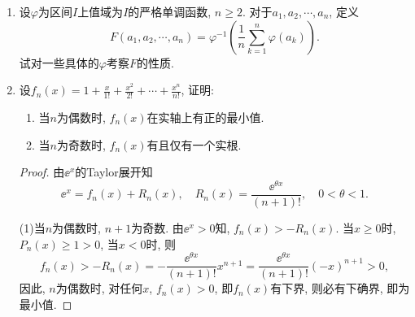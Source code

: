 \begin{3b}
\begin{enumerate}
\begin{proof}[解答]
例如，令 $g^{\prime \prime}(x)=\frac{1}{x^2+1}, g(0)=g^{\prime}(0)=0$，
则必有 $C>0$ 使得 $|g(x)| \leqslant C(|x|+1)$ $(\forall\, x \in \mathbb{R})$。具体地，有
\[g^{\prime}(x)=\arctan x \ \ \Rightarrow \ \ g(x)=x \arctan x-\frac{\ln (x^2+1)}{2},\ \ 0 \leqslant g(x) \leqslant \frac{\pi|x|}{2}.\]
因此，取 $f(x)=\frac{2}{\pi} g(x)$ 即得一个在 $\mathbb{R}$ 上任意次可导的严格凸函数满足 $0 \leqslant f(x) \leqslant |x|$。

若令 $g^{\prime \prime}(x)=\frac{1}{(x^2+1)^{\frac{3}{2}}}, g(0)=g^{\prime}(0)=0$，则
\[g^{\prime}(x)=\frac{x}{\sqrt{x^2+1}} \ \ \Rightarrow \ \ g(x)=\sqrt{x^2+1}-1.\]
若令 $g^{\prime \prime}(x)=\frac{2|x|}{(x^2+1)^2}, g(0)=g^{\prime}(0)=0$，则
\[g^{\prime}(x)=\frac{x^2 \operatorname{sgn}(x)}{x^2+1}\ \ \Rightarrow\ \ g(x)=|x|-\arctan |x|.\]
若令 $g^{\prime \prime}(x)=e^{-|x|}, g(0)=g^{\prime}(0)=0$，则
\[g^{\prime}(x)=\big(1-e^{-|x|}\big) \operatorname{sgn}(x)\ \ \Rightarrow\ \ g(x)=|x|+e^{-|x|}.\]
若令 $g^{\prime \prime}(x)=e^{-|x|}, g(0)=g^{\prime}(0)=0$，则
\[g^{\prime}(x)=\big(1-e^{-|x|}\big) \operatorname{sgn}(x)\ \ \Rightarrow\ \ g(x)=|x|+e^{-|x|}.\qedhere\]
\end{proof}
\item 设\(\varphi\)为区间\(I\)上值域为\(I\)的严格单调函数, \(n\geqslant 2\). 
对于\(a_1,a_2,\cdots,a_n\), 定义
\[F(a_1,a_2,\cdots,a_n)=\varphi^{-1}\left(\frac{1}{n}\sum_{k=1}^{n}\varphi(a_k)\right).\]
试对一些具体的\(\varphi\)考察\(F\)的性质.
\item 设\(f_n(x)=1+\frac{x}{1!}+\frac{x^2}{2!}+\cdots+\frac{x^n}{n!}\), 
证明:\begin{enumerate}[label=(\arabic*)]
\item 当\(n\)为偶数时, \(f_n(x)\)在实轴上有正的最小值.
\item 当\(n\)为奇数时, \(f_n(x)\)有且仅有一个实根.
\end{enumerate}
\begin{proof}
由\(\ee^x\)的Taylor展开知\[\ee^x=f_n(x)+R_n(x),\quad R_n(x)=\frac{\ee^{\theta x}}{(n+1)!},\quad 0<\theta<1.\]

(1)当\(n\)为偶数时, \(n+1\)为奇数. 由\(\ee^x>0\)知, \(f_n(x)>-R_n(x)\). 
当\(x\geqslant 0\)时, \(P_n(x)\geqslant 1>0\), 当\(x<0\)时, 则
\[f_n(x)>-R_n(x)=-\frac{\ee^{\theta x}}{(n+1)!}x^{n+1}
=\frac{\ee^{\theta x}}{(n+1)!}(-x)^{n+1}>0,\]
因此, \(n\)为偶数时, 对任何\(x\), \(f_n(x)>0\), 即\(f_n(x)\)有下界, 则必有下确界, 即为最小值.


\end{proof}
\end{enumerate}
\end{3b}

